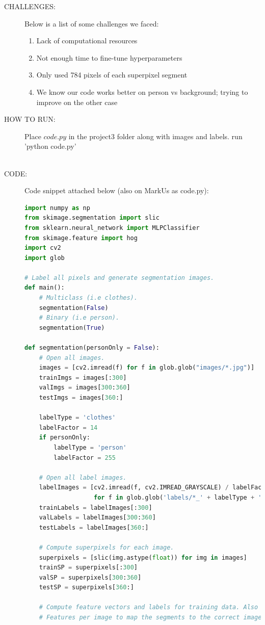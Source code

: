 \documentclass{csc_assignment5}
\begin{document}
\begin{description}
\item[CHALLENGES:] 
Below is a list of some challenges we faced:
\begin{enumerate} 
\item Lack of computational resources
\item Not enough time to fine-tune hyperparameters
\item Only used 784 pixels of each superpixel segment 
\item We know our code works better on person vs background; trying to improve on the other case
\end{enumerate}

\item[HOW TO RUN:]
Place $code.py$ in the project3 folder along with images and labels. run 'python code.py' \\\\

\item[CODE:] Code snippet attached below (also on MarkUs as code.py): 
\begin{lstlisting}[language=Python]
import numpy as np
from skimage.segmentation import slic
from sklearn.neural_network import MLPClassifier
from skimage.feature import hog
import cv2
import glob

# Label all pixels and generate segmentation images.
def main():
    # Multiclass (i.e clothes).
    segmentation(False)
    # Binary (i.e person).
    segmentation(True)

def segmentation(personOnly = False):
    # Open all images.
    images = [cv2.imread(f) for f in glob.glob("images/*.jpg")]
    trainImgs = images[:300]
    valImgs = images[300:360]
    testImgs = images[360:]
    
    labelType = 'clothes'
    labelFactor = 14
    if personOnly:
        labelType = 'person'
        labelFactor = 255
        
    # Open all label images.
    labelImages = [cv2.imread(f, cv2.IMREAD_GRAYSCALE) / labelFactor
                   for f in glob.glob('labels/*_' + labelType + '.png')]
    trainLabels = labelImages[:300]
    valLabels = labelImages[300:360]
    testLabels = labelImages[360:]
    
    # Compute superpixels for each image.
    superpixels = [slic(img.astype(float)) for img in images]
    trainSP = superpixels[:300]
    valSP = superpixels[300:360]
    testSP = superpixels[360:]
    
    # Compute feature vectors and labels for training data. Also get the
    # Features per image to map the segments to the correct image.
    

\end{lstlisting}
\end{description}
\end{document}
